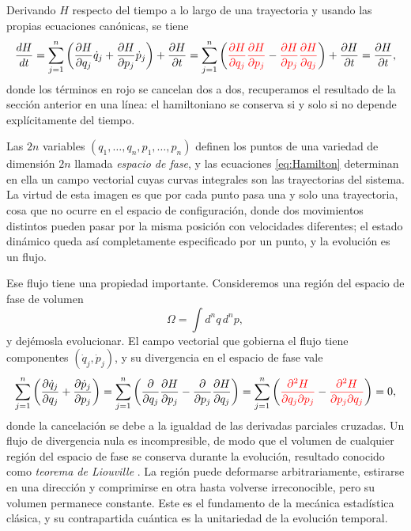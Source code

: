         Derivando $H$ respecto del tiempo a lo largo de una trayectoria y usando las propias ecuaciones canónicas, se tiene
        \begin{equation}\label{eq:ConservacionH}
            \frac{dH}{dt} = \sum_{j=1}^{n}\left(\frac{\partial H}{\partial q_{j}}\dot{q}_{j} + \frac{\partial H}{\partial p_{j}}\dot{p}_{j}\right) + \frac{\partial H}{\partial t}
            = \sum_{j=1}^{n}\left(\textcolor{red}{\frac{\partial H}{\partial q_{j}}\frac{\partial H}{\partial p_{j}}} - \textcolor{red}{\frac{\partial H}{\partial p_{j}}\frac{\partial H}{\partial q_{j}}}\right) + \frac{\partial H}{\partial t} = \frac{\partial H}{\partial t},
        \end{equation}
        donde los términos en rojo se cancelan dos a dos, recuperamos el resultado de la sección anterior en una línea: el hamiltoniano se conserva si y solo si no depende explícitamente del tiempo.

        Las $2n$ variables $(q_{1},\ldots,q_{n},p_{1},\ldots,p_{n})$ definen los puntos de una variedad de dimensión $2n$ llamada \textit{espacio de fase}, y las ecuaciones \eqref{eq:Hamilton} determinan en ella un campo vectorial cuyas curvas integrales son las trayectorias del sistema. La virtud de esta imagen es que por cada punto pasa una y solo una trayectoria, cosa que no ocurre en el espacio de configuración, donde dos movimientos distintos pueden pasar por la misma posición con velocidades diferentes; el estado dinámico queda así completamente especificado por un punto, y la evolución es un flujo.

        Ese flujo tiene una propiedad importante. Consideremos una región del espacio de fase de volumen
        \begin{equation}\label{eq:VolumenFase}
            \Omega = \int d^{n}q\,d^{n}p,
        \end{equation}
        y dejémosla evolucionar. El campo vectorial que gobierna el flujo tiene componentes $(\dot{q}_{j},\dot{p}_{j})$, y su divergencia en el espacio de fase vale
        \begin{equation}\label{eq:DivergenciaFlujo}
            \sum_{j=1}^{n}\left(\frac{\partial\dot{q}_{j}}{\partial q_{j}} + \frac{\partial\dot{p}_{j}}{\partial p_{j}}\right)
            = \sum_{j=1}^{n}\left(\frac{\partial}{\partial q_{j}}\frac{\partial H}{\partial p_{j}} - \frac{\partial}{\partial p_{j}}\frac{\partial H}{\partial q_{j}}\right)
            = \sum_{j=1}^{n}\left(\textcolor{red}{\frac{\partial^{2}H}{\partial q_{j}\partial p_{j}}} - \textcolor{red}{\frac{\partial^{2}H}{\partial p_{j}\partial q_{j}}}\right) = 0,
        \end{equation}
        donde la cancelación se debe a la igualdad de las derivadas parciales cruzadas. Un flujo de divergencia nula es incompresible, de modo que el volumen de cualquier región del espacio de fase se conserva durante la evolución, resultado conocido como \textit{teorema de Liouville} \citep{liouville1838note}. La región puede deformarse arbitrariamente, estirarse en una dirección y comprimirse en otra hasta volverse irreconocible, pero su volumen permanece constante. Este es el fundamento de la mecánica estadística clásica, y su contrapartida cuántica es la unitariedad de la evolución temporal.

